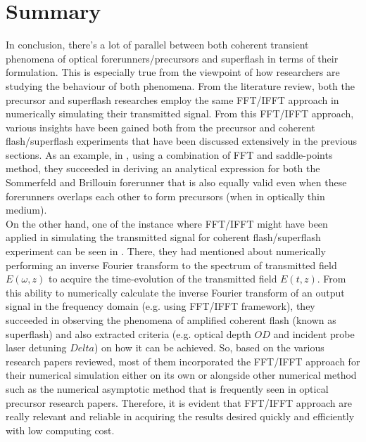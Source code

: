 \chapter{Summary}
In conclusion, there's a lot of parallel between both coherent transient phenomena of optical forerunners/precursors and superflash in terms of their formulation. This is especially true from the viewpoint of how researchers are studying the behaviour of both phenomena. From the literature review, both the precursor and superflash researches employ the same FFT/IFFT approach in numerically simulating their transmitted signal. From this FFT/IFFT approach, various insights have been gained both from the precursor and coherent flash/superflash experiments that have been discussed extensively in the previous sections. As an example, in \cite{Macke2013}, using a combination of FFT and saddle-points method, they succeeded in deriving an analytical expression for both the Sommerfeld and Brillouin forerunner that is also equally valid even when these forerunners overlaps each other to form precursors (when in optically thin medium).\\

On the other hand, one of the instance where FFT/IFFT might have been applied in simulating the transmitted signal for coherent flash/superflash experiment can be seen in \cite{Kwong2014}. There, they had mentioned about numerically performing an inverse Fourier transform to the spectrum of transmitted field $E(\omega, z)$ to acquire the time-evolution of the transmitted field $E(t, z)$. From this ability to numerically calculate the inverse Fourier transform of an output signal in the frequency domain (e.g. using FFT/IFFT framework), they succeeded in observing the phenomena of amplified coherent flash (known as superflash) and also extracted criteria (e.g. optical depth $OD$ and incident probe laser detuning $Delta$) on how it can be achieved. So, based on the various research papers reviewed, most of them incorporated the FFT/IFFT approach for their numerical simulation either on its own or alongside other numerical method such as the numerical asymptotic method that is frequently seen in optical precursor research papers. Therefore, it is evident that FFT/IFFT approach are really relevant and reliable in acquiring the results desired quickly and efficiently with low computing cost.\\

